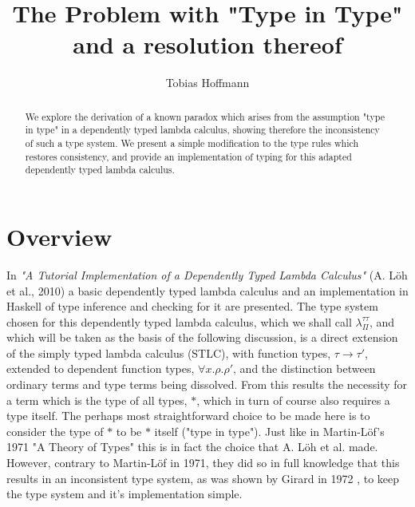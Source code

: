 \documentclass[runningheads]{llncs}
\begin{document}
%
\title{The Problem with "Type in Type" and a resolution thereof}
%
%
\author{Tobias Hoffmann}
%
%
%
\maketitle              %
%
\begin{abstract}
We explore the derivation of a known paradox which arises from the assumption
"type in type" in a dependently typed lambda calculus, showing therefore the
inconsistency of such a type system. We present a simple modification to the
type rules which restores consistency, and provide an implementation of typing
for this adapted dependently typed lambda calculus.
\end{abstract}
%
%
%
\section{Overview}

In \textit{"A Tutorial Implementation of a Dependently Typed Lambda Calculus"}
(A. Löh et al., 2010) \cite{loh2010tutorial} a basic dependently typed lambda
calculus and an implementation in Haskell of type inference and checking for it
are presented. The type system chosen for this dependently typed lambda
calculus, which we shall call $\lambda_{\Pi}^{\tau \tau}$, and which will be
taken as the basis of the following discussion, is a direct extension of the
simply typed lambda calculus (STLC), with function types, $\tau \rightarrow
\tau'$, extended to dependent function types, $\forall x . \rho . \rho'$, and
the distinction between ordinary terms and type terms being dissolved. From this
results the necessity for a term which is the type of all types, $\ast$, which
in turn of course also requires a type itself. The perhaps most straightforward
choice to be made here is to consider the type of $\ast$ to be $\ast$ itself
("type in type"). Just like in Martin-Löf's 1971 "A Theory of Types"
\cite{martin1971theory} this is in fact the choice that A. Löh et al. made.
However, contrary to Martin-Löf in 1971, they did so in full knowledge that this
results in an inconsistent type system, as was shown by Girard in 1972
\cite{girard1972interpretation}, to keep the type system and it's implementation
simple.
\end{document}
